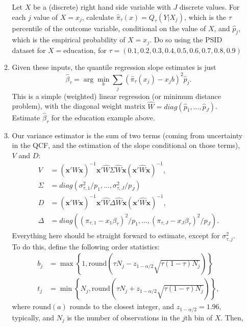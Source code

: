\documentclass[11pt, a4paper]{article}
\begin{document}
\begin{enumerate}
\begin{enumerate}
    Let $X$ be a (discrete) right hand side variable with $J$ discrete
    values.  For each $j$ value of $X = x_{j}$, calculate
    $\hat{\pi}_{\tau}(x) = Q_{\tau}(Y|X_{j})$, which is the $\tau$
    percentile of the outcome variable, conditional on the value of
    $X$, and $\hat{p}_{j}$, which is the empirical probability of
    $X = x_{j}$.  Do so using the PSID dataset for
    $X = \textrm{education}$, for $\tau = (0.1,0.2,0.3,0.4,0.5,0.6,0.7,0.8,0.9)$
  \item Given these inputs, the quantile regression slope
    estimates is just
    $$ \hat{\beta}_{\tau} = \arg\min_{b} \sum_{j} (\hat{\pi}_{\tau}(x_{j}) - x_{j}b)^{2}\hat{p}_{j}.$$
    This is a simple (weighted) linear regression (or minimum distance
    problem), with the diagonal weight matrix
    $\hat{W} = diag(\hat{p}_{1}, \ldots, \hat{p}_{J})$. Estimate
    $\hat{\beta}_{\tau}$ for the education example above.
  \item Our variance estimator is the sum of two terms (coming from
    uncertainty in the QCF, and the estimation of the slope
    conditional on those terms), $V$ and $D$:
    \begin{align*}
  V &= \left(\boldsymbol{x}'\hat{W}\boldsymbol{x}\right)^{-1}\boldsymbol{x}'\hat{W}\Sigma\hat{W}\boldsymbol{x}\left(\boldsymbol{x}'\hat{W}\boldsymbol{x}\right)^{-1},\\
  \Sigma &= diag(\sigma^{2}_{\tau,1}/p_{1}, \ldots, \sigma^{2}_{\tau,J}/p_{J})\\
  D &= \left(\boldsymbol{x}'\hat{W}\boldsymbol{x}\right)^{-1}\boldsymbol{x}'\hat{W}\Delta\hat{W}\boldsymbol{x}\left(\boldsymbol{x}'\hat{W}\boldsymbol{x}\right)^{-1},\\
  \Delta &= diag((\pi_{\tau,1} - x_{1}\beta_{\tau})^{2}/p_{1}, \ldots, (\pi_{\tau,J} - x_{J}\beta_{\tau})^{2}/p_{J}).
\end{align*}
Everything here should be straight forward to estimate, except for
$\sigma^{2}_{\tau,j}$. To do this, define the following order
statistics:
\begin{align*}
  b_{j} &= \max \left\{1, \mathrm{round}\left(\tau N_{j} - z_{1-\alpha/2}\sqrt{\tau(1-\tau)N_{j}}\right)\right\}\\
  t_{j} &= \min \left\{N_{j}, \mathrm{round}\left(\tau N_{j} + z_{1-\alpha/2}\sqrt{\tau(1-\tau)N_{j}}\right)\right\},
\end{align*}
where $\mathrm{round}(a)$ rounds to the closest integer, and
$z_{1-\alpha/2} = 1.96$, typically, and $N_{j}$ is the number of
observations in the $j$th bin of $X$. Then,
\begin{equation}

\end{equation}
\end{enumerate}
\end{enumerate}
\end{document}
